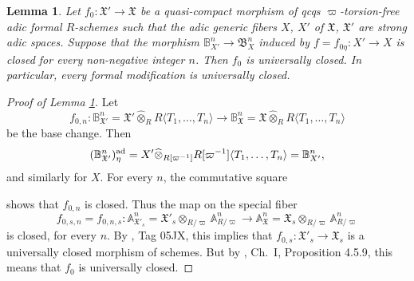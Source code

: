 \documentclass[12pt,twoside,a4paper]{article}
\newtheorem{lemma}[thm]{Lemma}
\theoremstyle{definition}
\theoremstyle{remark}
\newcommand\ad{{\rm ad}}
\newcommand\spc{{\rm sp}}
\begin{document}
\begin{lemma}\label{Formal modifications are universally closed}Let $f_{0}: \mathfrak{X}'\to\mathfrak{X}$ be a quasi-compact morphism of qcqs $\varpi$-torsion-free adic formal $R$-schemes such that the adic generic fibers $X$, $X'$ of $\mathfrak{X}$, $\mathfrak{X}'$ are strong adic spaces. Suppose that the morphism $\mathbb{B}_{X'}^{n}\to \mathfrak{B}_{X}^{n}$ induced by $f=f_{0\eta}: X'\to X$ is closed for every non-negative integer $n$. Then $f_{0}$ is universally closed. In particular, every formal modification is universally closed.\end{lemma}
\begin{proof}[Proof of Lemma \ref{Formal modifications are universally closed}]Let \begin{equation*}f_{0, n}: \mathbb{B}_{\mathfrak{X}'}^{n}=\mathfrak{X}'\widehat{\otimes}_{R}R\langle T_1,\dots, T_n\rangle\to \mathbb{B}_{\mathfrak{X}}^{n}=\mathfrak{X}\widehat{\otimes}_{R}R\langle T_1,\dots, T_n\rangle\end{equation*}be the base change. Then \begin{equation*}(\mathbb{B}_{\mathfrak{X}'}^{n})_{\eta}^{\ad}=X'\widehat{\otimes}_{R[\varpi^{-1}]}R[\varpi^{-1}]\langle T_1,\dots, T_n\rangle=\mathbb{B}_{X'}^{n},\end{equation*}and similarly for $X$. For every $n$, the commutative square \begin{center}\end{center}shows that $f_{0, n}$ is closed. Thus the map on the special fiber \begin{equation*}f_{0,s,n}=f_{0,n,s}: \mathbb{A}_{\mathfrak{X}'_{s}}^{n}=\mathfrak{X}'_{s}\otimes_{R/\varpi}\mathbb{A}_{R/\varpi}^{n}\to \mathbb{A}_{\mathfrak{X}}^{n}=\mathfrak{X}_{s}\otimes_{R/\varpi}\mathbb{A}_{R/\varpi}^{n}\end{equation*}is closed, for every $n$. By \cite{Stacks}, Tag 05JX, this implies that $f_{0,s}: \mathfrak{X}'_{s}\to \mathfrak{X}_{s}$ is a universally closed morphism of schemes. But by \cite{FK}, Ch.~I, Proposition 4.5.9, this means that $f_{0}$ is universally closed. \end{proof}  
\end{document}
